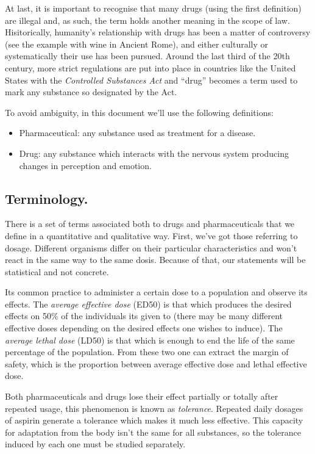 At last, it is important to recognise that many drugs (using the first definition) are illegal and, as such, the term holds another meaning in the scope of law. Hisitorically, humanity's relationship with drugs has been a matter of controversy (see the example with wine in Ancient Rome), and either culturally or systematically their use has been pursued. Around the last third of the 20th century, more strict regulations are put into place in countries like the United States with the \textit{Controlled Substances Act} and \enquote{drug} becomes a term used to mark any substance so designated by the Act.

To avoid ambiguity, in this document we'll use the following definitions:

\begin{itemize}
	\item Pharmaceutical: any substance used as treatment for a disease.
	\item Drug: any substance which interacts with the nervous system producing changes in perception and emotion.
\end{itemize}

\subsection{Terminology.}

There is a set of terms associated both to drugs and pharmaceuticals that we define in a quantitative and qualitative way. First, we've got those referring to dosage. Different organisms differ on their particular characteristics and won't react in the same way to the same dosis. Because of that, our statements will be statistical and not concrete.

Its common practice to administer a certain dose to a population and observe its effects. The \textit{average effective dose} (ED50) is that which produces the desired effects on 50\% of the individuals its given to (there may be many different effective doses depending on the desired effects one wishes to induce). The \textit{average lethal dose} (LD50) is that which is enough to end the life of the same percentage of the population. From these two one can extract the margin of safety, which is the proportion between average effective dose and lethal effective dose.

Both pharmaceuticals and drugs lose their effect partially or totally after repeated usage, this phenomenon is known as \textit{tolerance}. Repeated daily dosages of aspirin generate a tolerance which makes it much less effective. This capacity for adaptation from the body isn't the same for all substances, so the tolerance induced by each one must be studied separately.

